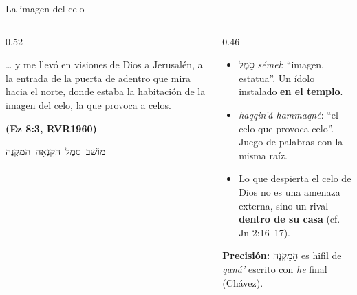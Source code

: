 \documentclass[hyperref={bookmarks=false},aspectratio=169]{beamer}
\newcommand{\heb}[1]{\mbox{\foreignlanguage{hebrew}{#1}}}
\newcommand{\fuente}[1]{\par\hfill{\upshape\bfseries\footnotesize\textcolor{azul}{#1}}}
\newcommand{\destacar}[1]{\textbf{\textcolor{azul}{#1}}}
\newcommand{\precision}[1]{{\footnotesize\color{gris}\textbf{Precisión:} #1}}
\begin{document}
\begin{frame}{La imagen del celo}
\begin{columns}[c,onlytextwidth]
\begin{column}{0.52\textwidth}
\begin{cita}\ldots{} y me llevó en visiones de Dios a Jerusalén, a la entrada de la puerta de adentro que mira hacia el norte, donde estaba la habitación de la imagen del celo, la que provoca a celos.\fuente{(Ez 8:3, RVR1960)}\end{cita}
\begin{center}\heb{מוֹשַׁב סֵמֶל הַקִּנְאָה הַמַּקְנֶה}\end{center}
\end{column}
\begin{column}{0.46\textwidth}\small
\begin{itemize}
\item \heb{סֵמֶל} \emph{sémel}: ``imagen, estatua''. Un ídolo instalado \destacar{en el templo}.
\item \emph{haqqin'á hammaqné}: ``el celo que provoca celo''. Juego de palabras con la misma raíz.
\item Lo que despierta el celo de Dios no es una amenaza externa, sino un rival \destacar{dentro de su casa} (cf. Jn 2:16--17).
\end{itemize}
\precision{\heb{הַמַּקְנֶה} es hifil de \emph{qaná'} escrito con \emph{he} final (Chávez).}
\end{column}
\end{columns}
\end{frame}
\end{document}

